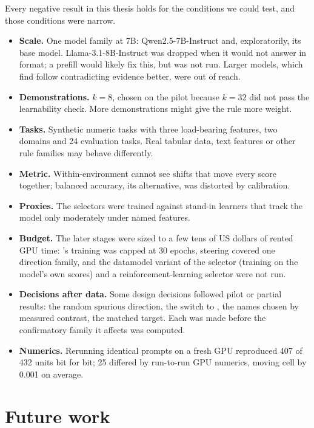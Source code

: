 Every negative result in this thesis holds for the conditions we could test, and those conditions were narrow.

\begin{itemize}[leftmargin=1.5em]
  \item \textbf{Scale.} One model family at 7B: Qwen2.5-7B-Instruct and, exploratorily, its base model. Llama-3.1-8B-Instruct was dropped when it would not answer in format; a prefill would likely fix this, but was not run. Larger models, which \citet{wei2023larger} find follow contradicting evidence better, were out of reach.
  \item \textbf{Demonstrations.} $k = 8$, chosen on the pilot because $k = 32$ did not pass the learnability check. More demonstrations might give the rule more weight.
  \item \textbf{Tasks.} Synthetic numeric tasks with three load-bearing features, two domains and 24 evaluation tasks. Real tabular data, text features or other rule families may behave differently.
  \item \textbf{Metric.} Within-environment \AUROC cannot see shifts that move every score together; balanced accuracy, its alternative, was distorted by calibration.
  \item \textbf{Proxies.} The selectors were trained against stand-in learners that track the model only moderately under named features.
  \item \textbf{Budget.} The later stages were sized to a few tens of US dollars of rented GPU time: \satami's training was capped at 30 epochs, steering covered one direction family, and the datamodel variant of the selector (training on the model's own scores) and a reinforcement-learning selector were not run.
  \item \textbf{Decisions after data.} Some design decisions followed pilot or partial results: the random spurious direction, the switch to \AUROC, the names chosen by measured contrast, the matched target. Each was made before the confirmatory family it affects was computed.
  \item \textbf{Numerics.} Rerunning identical prompts on a fresh GPU reproduced 407 of 432 units bit for bit; 25 differed by run-to-run GPU numerics, moving cell \AUROC by 0.001 on average.
\end{itemize}

\section{Future work}

